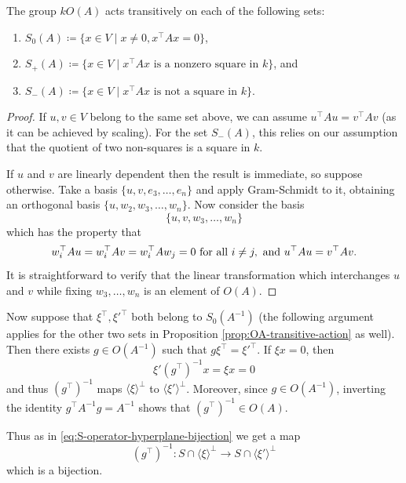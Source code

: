 \begin{prop}\label{prop:OA-transitive-action}
	The group $kO(A)$ acts transitively on each of the following sets:
	\begin{enumerate}
		\item $S_0(A) \coloneqq \{x \in V \mid x\neq 0, x^\top A x = 0\}$,
		\item $S_+(A) \coloneqq \{ x\in V \mid x^\top A x \text{ is a nonzero square in } k\}$, and
		\item $S_-(A) \coloneqq \{ x\in V \mid x^\top A x \text{ is not a square in } k\}$.
	\end{enumerate}
\end{prop}
\begin{proof}
	If $u,v\in V$ belong to the same set above, we can assume $u^\top A u = v^\top A v$ (as it can be achieved by scaling). For the set $S_-(A)$, this relies on our assumption that the quotient of two non-squares is a square in $k$.
	
	If $u$ and $v$ are linearly dependent then the result is immediate, so suppose otherwise. Take a basis $\{u,v,e_3,\ldots,e_n\}$ and apply Gram-Schmidt to it, obtaining an orthogonal basis $\{u, w_2, w_3, \ldots,w_n\}$. Now consider the basis
	\[
		\{u,v,w_3,\ldots,w_n\}
	\]
	which has the property that
	\[
		w_i^\top A u = w_i^\top A v = w_i^\top A w_j = 0 \text{ for all } i \neq j, \text{ and }\\
		u^\top A u = v^\top A v.
	\]
	It is straightforward to verify that the linear transformation which interchanges $u$ and $v$ while fixing $w_3,\ldots,w_n$ is an element of $O(A)$.
\end{proof}


Now suppose that $\xi^\top,\xi'^\top$ both belong to $S_0(A^{-1})$ (the following argument applies for the other two sets in Proposition \ref{prop:OA-transitive-action} as well). Then there exists $g \in O(A^{-1})$ such that $g \xi^\top = \xi'^\top$. If $\xi x = 0$, then
\[
	\xi' (g^\top)^{-1} x = \xi x = 0
\]
and thus $(g^\top)^{-1}$ maps $\langle \xi \rangle^\bot$ to $\langle \xi' \rangle^\bot$. Moreover, since $g \in O(A^{-1})$, inverting the identity $g^\top A^{-1} g = A^{-1}$ shows that $(g^\top)^{-1} \in O(A)$.

Thus as in \eqref{eq:S-operator-hyperplane-bijection} we get a map
\[
	(g^\top)^{-1} \colon S \cap \langle \xi \rangle^\bot \to S \cap \langle \xi' \rangle^\bot
\]
which is a bijection.

